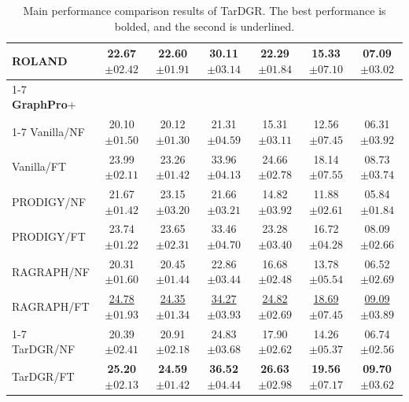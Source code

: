 \documentclass[letterpaper]{article} %
\begin{document}
\begin{table}[t]
\begin{tabular}{lcccccc}
        ROLAND       & 22.67$\scriptstyle{\pm 02.42}$ & 22.60$\scriptstyle{\pm 01.91}$ & {30.11}$\scriptstyle{\pm 03.14}$ & {22.29}$\scriptstyle{\pm 01.84}$ & {15.33}$\scriptstyle{\pm 07.10}$ & {07.09}$\scriptstyle{\pm 03.02}$ \\
        \cmidrule(lr){1-7}
        \textbf{GraphPro}+ \\
        \cmidrule(lr){1-7}
        Vanilla/NF  & 20.10$\scriptstyle{\pm 01.50}$ & 20.12$\scriptstyle{\pm 01.30}$ & 21.31$\scriptstyle{\pm 04.59}$ & 15.31$\scriptstyle{\pm 03.11}$ & 12.56$\scriptstyle{\pm 07.45}$ & 06.31$\scriptstyle{\pm 03.92}$ \\
        Vanilla/FT  & {23.99}$\scriptstyle{\pm 02.11}$ & 23.26$\scriptstyle{\pm 01.42}$ & {33.96}$\scriptstyle{\pm 04.13}$ & {24.66}$\scriptstyle{\pm 02.78}$ & 18.14$\scriptstyle{\pm 07.55}$ & 08.73$\scriptstyle{\pm 03.74}$ \\
        PRODIGY/NF  & 21.67$\scriptstyle{\pm 01.42}$ & 23.15$\scriptstyle{\pm 03.20}$ & 21.66$\scriptstyle{\pm 03.21}$ & 14.82$\scriptstyle{\pm 03.92}$ & 11.88$\scriptstyle{\pm 02.61}$ & 05.84$\scriptstyle{\pm 01.84}$ \\
        PRODIGY/FT  & {23.74}$\scriptstyle{\pm 01.22}$ & 23.65$\scriptstyle{\pm 02.31}$ &{33.46}$\scriptstyle{\pm 04.70}$ &{23.28}$\scriptstyle{\pm 03.40}$ & 16.72$\scriptstyle{\pm 04.28}$ &{08.09}$\scriptstyle{\pm 02.66}$ \\
        RAGRAPH/NF  & 20.31$\scriptstyle{\pm 01.60}$ & 20.45$\scriptstyle{\pm 01.44}$ & 22.86$\scriptstyle{\pm 03.44}$ & 16.68$\scriptstyle{\pm 02.48}$ & 13.78$\scriptstyle{\pm 05.54}$ & 06.52$\scriptstyle{\pm 02.69}$ \\
        RAGRAPH/FT  &\underline{24.78}$\scriptstyle{\pm 01.93}$ &\underline{24.35}$\scriptstyle{\pm 01.34}$ & \underline{34.27}$\scriptstyle{\pm 03.93}$ & \underline{24.82}$\scriptstyle{\pm 02.69}$ &\underline{18.69}$\scriptstyle{\pm 07.45}$ & \underline{09.09}$\scriptstyle{\pm 03.89}$ \\
        \cmidrule(lr){1-7}
        TarDGR/NF    & 20.39$\scriptstyle{\pm 02.41}$ & 20.91$\scriptstyle{\pm 02.18}$ & {24.83}$\scriptstyle{\pm 03.68}$ & {17.90}$\scriptstyle{\pm 02.62}$ & {14.26}$\scriptstyle{\pm 05.37}$ & {06.74}$\scriptstyle{\pm 02.56}$ \\
        TarDGR/FT    & \textbf{25.20}$\scriptstyle{\pm 02.13}$ & \textbf{24.59}$\scriptstyle{\pm 01.42}$ & \textbf{36.52}$\scriptstyle{\pm 04.44}$ & \textbf{26.63}$\scriptstyle{\pm 02.98}$ & \textbf{19.56}$\scriptstyle{\pm 07.17}$ & \textbf{09.70}$\scriptstyle{\pm 03.62}$ \\
        \bottomrule
    \end{tabular}
    \caption{Main performance comparison results of TarDGR. The best performance is bolded, and the second is underlined.}
    \label{tab:overall}
    \vspace{-0.2cm}
\end{table}
\end{document}
